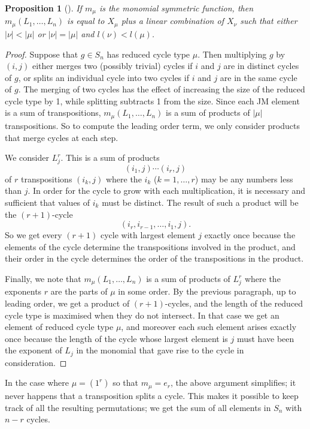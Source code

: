 \documentclass[10pt]{article}
\newtheorem{proposition}[theorem]{Proposition}
\theoremstyle{definition}
\begin{document}
\begin{proposition}[{\cite[Theorem 1.9]{Murphy}}] \label{murphy_prop}
If $m_\mu$ is the monomial symmetric function, then $m_\mu(L_1, \ldots, L_n)$ is equal to $X_\mu$ plus a linear combination of $X_\nu$ such that either $|\nu| < |\mu|$ or $|\nu| = |\mu|$ and $l(\nu) < l(\mu)$.
\end{proposition}
\begin{proof}
Suppose that $g \in S_n$ has reduced cycle type $\mu$. Then multiplying $g$ by $(i,j)$ either merges two (possibly trivial) cycles if $i$ and $j$ are in distinct cycles of $g$, or splits an individual cycle into two cycles if $i$ and $j$ are in the same cycle of $g$. The merging of two cycles has the effect of increasing the size of the reduced cycle type by 1, while splitting subtracts 1 from the size. Since each JM element is a sum of transpositions, $m_\mu(L_1, \ldots, L_n)$ is a sum of products of $|\mu|$ transpositions. So to compute the leading order term, we only consider products that merge cycles at each step.

We consider $L_j^r$. This is a sum of products
\[
(i_1, j)\cdots (i_r,j)
\]
of $r$ transpositions $(i_k,j)$ where the $i_k$ ($k=1,\ldots,r$) may be any numbers less than $j$. In order for the cycle to grow with each multiplication, it is necessary and sufficient that values of $i_k$ must be distinct. The result of such a product will be the $(r+1)$-cycle
\[
(i_r, i_{r-1}, \ldots, i_1, j).
\]
So we get every $(r+1)$ cycle with largest element $j$ exactly once because the elements of the cycle determine the transpositions involved in the product, and their order in the cycle determines the order of the transpositions in the product.

Finally, we note that $m_\mu(L_1, \ldots, L_n)$ is a sum of products of $L_j^r$ where the exponents $r$ are the parts of $\mu$ in some order. By the previous paragraph, up to leading order, we get a product of $(r+1)$-cycles, and the length of the reduced cycle type is maximised when they do not intersect. In that case we get an element of reduced cycle type $\mu$, and moreover each such element arises exactly once because the length of the cycle whose largest element is $j$ must have been the exponent of $L_j$ in the monomial that gave rise to the cycle in consideration.
\end{proof}

In the case where $\mu = (1^r)$ so that $m_\mu = e_r$, the above argument simplifies; it never happens that a transposition splits a cycle. This makes it possible to keep track of all the resulting permutations; we get the sum of all elements in $S_n$ with $n-r$ cycles.
\end{document}
